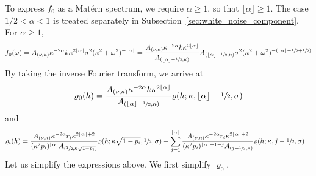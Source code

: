 \documentclass[11pt,a4paper]{article}
\theoremstyle{plain}
\theoremstyle{definition}
\begin{document}
To express $f_0$ as a Mat\'ern spectrum, we require
$\alpha\geq1$, so that $\lfloor\alpha\rfloor\geq1$.
The case $1/2<\alpha<1$ is treated separately in
Subsection~\ref{sec:white_noise_component}. For $\alpha\geq1$,
\begin{align}
    f_0(\omega) = A_{(\nu,\kappa)}\kappa^{-2\alpha}k\kappa^{2\lfloor\alpha\rfloor}\sigma^2(\kappa^2+\omega^2)^{-\lfloor\alpha\rfloor} = \dfrac{A_{(\nu,\kappa)}\kappa^{-2\alpha}k\kappa^{2\lfloor\alpha\rfloor}}{A_{(\lfloor\alpha\rfloor-\sfrac{1}{2},\kappa)}}A_{(\lfloor\alpha\rfloor-\sfrac{1}{2},\kappa)}\sigma^2(\kappa^2+\omega^2)^{-(\lfloor\alpha\rfloor-\sfrac{1}{2}+\sfrac{1}{2})}
\end{align}
By taking the inverse Fourier transform, we arrive at
\begin{align}
    \varrho_0(h) = \dfrac{A_{(\nu,\kappa)}\kappa^{-2\alpha}k\kappa^{2\lfloor\alpha\rfloor}}{A_{(\lfloor\alpha\rfloor-\sfrac{1}{2},\kappa)}}\varrho(h;\kappa, \lfloor\alpha\rfloor-\sfrac{1}{2}, \sigma)
\end{align}
and
\begin{align}
    \varrho_i(h)  &= \dfrac{A_{(\nu,\kappa)}\kappa^{-2\alpha}r_i\kappa^{2\lfloor\alpha\rfloor+2}}{(\kappa^{2}p_i)^{\lfloor\alpha\rfloor}A_{(\sfrac{1}{2},\kappa\sqrt{1-p_i})}}\varrho(h;\kappa\sqrt{1-p_i}, \sfrac{1}{2}, \sigma)- \sum_{j=1}^{\lfloor\alpha\rfloor} \dfrac{A_{(\nu,\kappa)}\kappa^{-2\alpha}r_i\kappa^{2\lfloor\alpha\rfloor+2}}{(\kappa^{2}p_i)^{\lfloor\alpha\rfloor+1-j}A_{(j-\sfrac{1}{2},\kappa)}}\varrho(h;\kappa, j-\sfrac{1}{2}, \sigma)
\end{align}
Let us simplify the expressions above. We first simplify $\varrho_0$.
\end{document}
